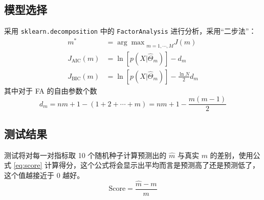     \subsection{模型选择}

    采用 \verb"sklearn.decomposition" 中的 \verb"FactorAnalysis" 进行分析，采用“二步法”：
    \begin{align*}
        m^* &= {\arg\max}_{m=1,\cdots,M}J(m)\\
        J_\text{AIC}(m) &= \ln\left[p(X|\hat{\Theta}_m)\right] - d_m\\
        J_\text{BIC}(m) &= \ln\left[p(X|\hat{\Theta}_m)\right] - \frac{\ln N}{2}d_m
    \end{align*}
    其中对于 FA 的自由参数个数
    \begin{equation*}
        d_m = nm + 1 - (1+2+\cdots+m) = nm + 1 - \frac{m(m-1)}{2}
    \end{equation*}

    \subsection{测试结果}

    测试将对每一对指标取 10 个随机种子计算预测出的 $\hat{m}$ 与真实 $m$ 的差别，使用公式 \ref{eq:score} 计算得分，这个公式将会显示出平均而言是预测高了还是预测低了，这个值越接近于 0 越好。
    \begin{equation}\label{eq:score}
        \mathrm{Score} = \frac{\hat{m} - m}{m}
    \end{equation}

